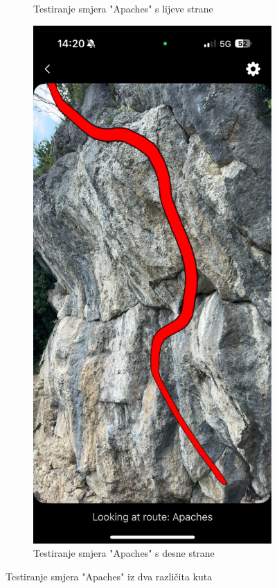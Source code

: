 \begin{figure}[H]
\begin{subfigure}[b]{0.45\textwidth}
        \caption{Testiranje smjera "Apaches" s lijeve strane}
        \label{fig:apaches_test_left_side}
    \end{subfigure}
    \hfill
    \begin{subfigure}[b]{0.45\textwidth}
        \centering
        \includegraphics[width=\textwidth]{images/testiranje/apaches_test_right_side.jpeg}
        \caption{Testiranje smjera "Apaches" s desne strane}
        \label{fig:apaches_test_right_side}
    \end{subfigure}
    \caption{Testiranje smjera "Apaches" iz dva različita kuta}
    \label{fig:apaches_test_double}
\end{figure}

